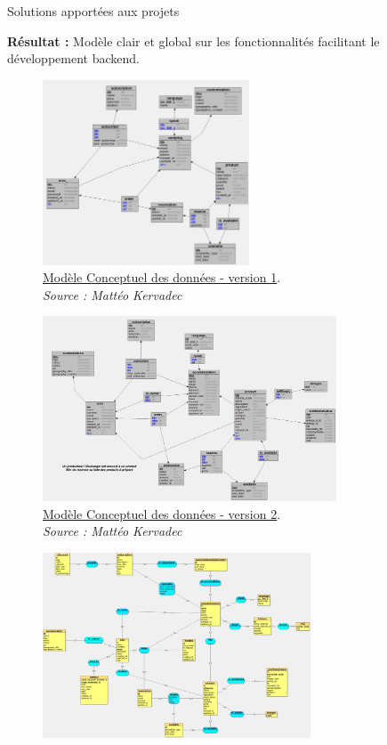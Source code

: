 \documentclass{beamer}
\begin{document}
\begin{frame}[label=realisation]{Solutions apportées aux projets}
\begin{center}
{\begin{minipage}{0.9\textwidth}
				\textbf{Résultat :} Modèle clair et global sur les fonctionnalités facilitant le développement backend.
			\end{minipage}
		}
		 {
			\begin{figure}[t]
  				\includegraphics[height=5.5cm]{../img/conception/mcd_V1.jpg}
				\caption{	
					\centering			
  					\href{https://github.com/Matteo-K/Soutenance_E-delic/blob/main/img/conception/mcd_V1.jpg}{\underline{Modèle Conceptuel des données - version 1}}.\\
  					\textit{Source : Mattéo Kervadec}
				}
  				\label{fig:mcdV1}
  			\end{figure}
		}
		\only<6> {
			\addtocounter{figure}{1}
			\begin{figure}[t]
  				\includegraphics[height=5.5cm]{../img/conception/mcd_V2.jpg}
				\caption{	
					\centering			
  					\href{https://github.com/Matteo-K/Soutenance_E-delic/blob/main/img/conception/mcd_V2.jpg}{\underline{Modèle Conceptuel des données - version 2}}.\\
  					\textit{Source : Mattéo Kervadec}
				}
  				\label{fig:mcdV2}
  			\end{figure}
		}
		\only<7> {
			\addtocounter{figure}{2}
			\begin{figure}[t]
  				\includegraphics[height=5.5cm]{../img/conception/mcd_V3.jpg}

\end{figure}}
\end{center}
\end{frame}
\end{document}
